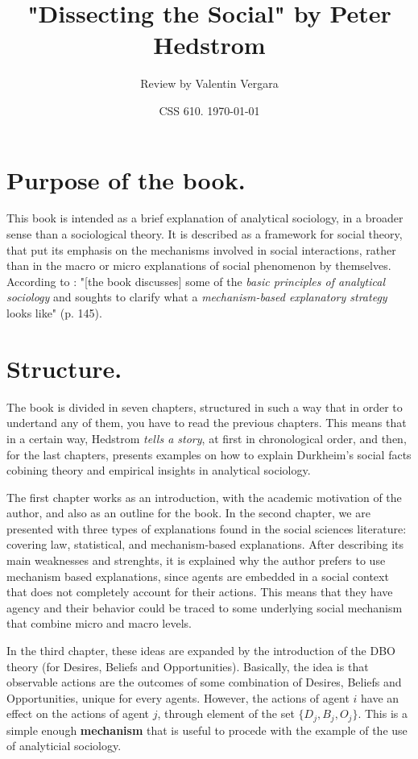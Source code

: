 \documentclass[11pt]{article}
\author{Review by Valentin Vergara}
\date{CSS 610. \today}
\title{"Dissecting the Social" by Peter Hedstrom}
\begin{document}
\maketitle

\section*{Purpose of the book.}
\label{sec:org9908bda}
This book is intended as a brief explanation of analytical sociology, in a broader sense than a sociological theory. It is described as a framework for social theory, that put its emphasis on the mechanisms involved in social interactions, rather than in the macro or micro explanations of social phenomenon by themselves. According to \citet{hedstrom2005}: "[the book discusses] some of the \emph{basic principles of analytical sociology} and soughts to clarify what a \emph{mechanism-based explanatory strategy} looks like" (p. 145).

\section*{Structure.}
\label{sec:orgb1d976a}
The book is divided in seven chapters, structured in such a way that in order to undertand any of them, you have to read the previous chapters. This means that in a certain way, Hedstrom \emph{tells a story}, at first in chronological order, and then, for the last chapters, presents examples on how to explain Durkheim's social facts \citep{durkheim1986} cobining theory and empirical insights in analytical sociology.

The first chapter works as an introduction, with the academic motivation of the author, and also as an outline for the book. In the second chapter, we are presented with three types of explanations found in the social sciences literature: covering law, statistical, and mechanism-based explanations. After describing its main weaknesses and strenghts, it is explained why the author prefers to use mechanism based explanations, since agents are embedded in a social context that does not completely account for their actions. This means that they have agency and their behavior could be traced to some underlying social mechanism that combine micro and macro levels.

In the third chapter, these ideas are expanded by the introduction of the DBO theory (for Desires, Beliefs and Opportunities). Basically, the idea is that observable actions are the outcomes of some combination of Desires, Beliefs and Opportunities, unique for every agents. However, the actions of agent \(i\) have an effect on the actions of agent \(j\), through element of the set \(\{D_{j}, B_{j}, O_{j} \}\). This is a simple enough  \textbf{mechanism} that is useful to procede with the example of the use of analyticial sociology.
\end{document}
